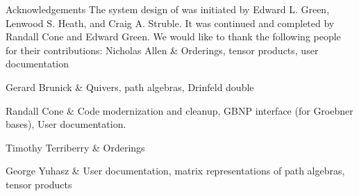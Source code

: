 {\secfont Acknowledgements}
\bigskip
The system design of {\QPA} was initiated by Edward L. Green,
Lenwood S. Heath, and Craig A. Struble.  It was continued and
completed by Randall Cone and Edward Green.
We would like to thank the following people
for their contributions:
\beginitems
Nicholas Allen &
    Orderings, tensor products, user documentation

Gerard Brunick &
    Quivers, path algebras, Drinfel\pif d double

Randall Cone &
    Code modernization and cleanup, GBNP interface (for Groebner bases),
    User documentation.

Timothy Terriberry &
    Orderings

George Yuhasz  & 
    User documentation, matrix representations of path algebras,
    tensor products
\enditems

